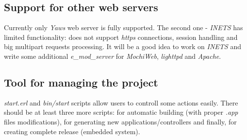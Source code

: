 \subsection{Support for other web servers}
Currently only {\it Yaws} web server is fully supported. The second one - {\it INETS} has limited functionality: does not support {\it https} connections, session handling and big multipart requests processing. It will be a good idea to work on {\it INETS} and write some additional {\it e\_mod\_server} for {\it MochiWeb}, {\it lighttpd} and {\it Apache}.

\subsection{Tool for managing the project}
{\it start.erl} and {\it bin/start} scripts allow users to controll some actions easily. There should be at least three more scripts: for automatic building (with proper {\it .app} files modifications), for generating new applications/controllers and finally, for creating complete release (embedded system).
